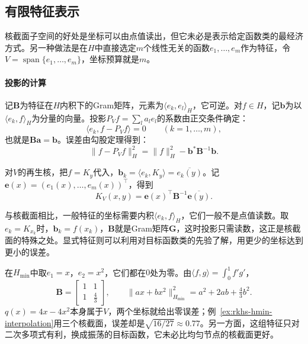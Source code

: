 \subsection{有限特征表示}
\label{sec:rkhs-finite-features}

核截面子空间的好处是坐标可以由点值读出，但它未必是表示给定函数类的最经济方式。另一种做法是在$H$中直接选定$m$个线性无关的函数$e_1,\ldots,e_m$作为特征，令$V=\operatorname{span}\{e_1,\ldots,e_m\}$，坐标预算就是$m$。

\paragraph{投影的计算}

记$\bm B$为特征在$H$内积下的Gram矩阵，元素为$\langle e_k,e_l\rangle_H$，它可逆。对$f\in H$，记$\bm b$为以$\langle e_k,f\rangle_H$为分量的向量。投影$P_Vf=\sum_la_le_l$的系数由正交条件确定：
\[
\langle e_k,f-P_Vf\rangle=0\qquad(k=1,\ldots,m),
\]
也就是$\bm B\bm a=\bm b$。误差由勾股定理得到：
\begin{equation}
\lVert f-P_Vf\rVert_H^2=\lVert f\rVert_H^2-\bm b^*\bm B^{-1}\bm b .
\label{eq:rkhs-feature-projection-error}
\end{equation}

对$V$的再生核，把$f=K_y$代入，$\bm b_k=\langle e_k,K_y\rangle=\overline{e_k(y)}$。记$\bm e(x)=(e_1(x),\ldots,e_m(x))^{\top}$，得到
\begin{equation}
K_V(x,y)=\bm e(x)^{\top}\bm B^{-1}\overline{\bm e(y)} .
\label{eq:rkhs-feature-subspace-kernel}
\end{equation}

与核截面相比，一般特征的坐标需要内积$\langle e_k,f\rangle_H$，它们一般不是点值读数。取$e_k=K_{x_k}$时，$\bm b_k=f(x_k)$，$\bm B$就是Gram矩阵$\bm G$，这时投影只需读数，这正是核截面的特殊之处。显式特征则可以利用对目标函数类的先验了解，用更少的坐标达到更小的误差。

\begin{example}[两个多项式特征]
\label{ex:rkhs-hmin-polynomial-features}
在$H_{\min}$中取$e_1=x$，$e_2=x^2$，它们都在$0$处为零。由$\langle f,g\rangle=\int_0^1f'g'$，
\[
\bm B=\begin{bmatrix}1&1\\1&\tfrac43\end{bmatrix},\qquad
\lVert a x+bx^2\rVert_{H_{\min}}^2=a^2+2ab+\tfrac43b^2 .
\]
$q(x)=4x-4x^2$本身属于$V$，两个坐标就给出零误差；例~\ref{ex:rkhs-hmin-interpolation}用三个核截面，误差却是$\sqrt{16/27}\approx0.77$。另一方面，这组特征只对二次多项式有利，换成振荡的目标函数，它未必比均匀节点的核截面更好。
\end{example}

